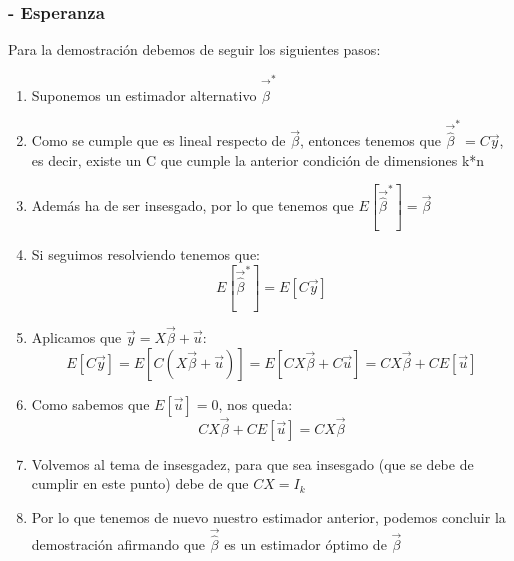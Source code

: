\documentclass[a4paper,12pt]{article}
\newcommand{\betaEstimada}{\vec{\hat{\beta}}}
\newcommand{\ecuacion}[1]{\ensuremath{#1}}
\begin{document}
\begin{itemize}
    \subsubsection*{- Esperanza}
    Para la demostración debemos de seguir los siguientes pasos:
    \begin{enumerate}
        \item Suponemos un estimador alternativo \ecuacion{\vec{\hat{\beta}}^*}
        \item Como se cumple que es lineal respecto de \ecuacion{\vec{\beta}}, entonces tenemos que \ecuacion{\vec{\hat{\beta}}^* = C\vec{y}}, es decir, existe un C que cumple la anterior condición de dimensiones k*n
        \item Además ha de ser insesgado, por lo que tenemos que \ecuacion{E[\vec{\hat{\beta}}^*] = \vec{\beta}}
        \item Si seguimos resolviendo tenemos que:
        \[
            E[\vec{\hat{\beta}}^*] = E[C\vec{y}]
        \]
        \item Aplicamos que \ecuacion{\vec{y} = X\vec{\beta}+\vec{u}}:
        \[
            E[C\vec{y}] = E[C(X\vec{\beta}+\vec{u})] = E[CX\vec{\beta}+C\vec{u}] = CX\vec{\beta}+CE[\vec{u}]
        \]
        \item Como sabemos que \ecuacion{E[\vec{u}] = 0}, nos queda:
        \[
            CX\vec{\beta}+CE[\vec{u}] = CX\vec{\beta}
        \]
        \item Volvemos al tema de insesgadez, para que sea insesgado (que se debe de cumplir en este punto) debe de que \ecuacion{CX=I_k}
        \item Por lo que tenemos de nuevo nuestro estimador anterior, podemos concluir la demostración afirmando que \ecuacion{\betaEstimada} es un estimador óptimo de \ecuacion{\vec{\beta}}
    \end{enumerate}

\end{itemize}
\end{document}

